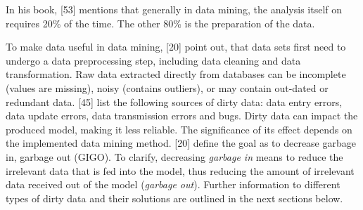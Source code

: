 In his book, \textcite{mccue2014data}[53] mentions that generally in data mining, the analysis itself on requires 20\% of the time. The other 80\% is the preparation of the data.

To make data useful in data mining, \textcite{DataMiningAndPredictiveAnalytics}[20] point out, that data sets first need to undergo a data preprocessing step, including data cleaning and data transformation. Raw data extracted directly from databases can be incomplete (values are missing), noisy (contains outliers), or may contain out-dated or redundant data. \textcite{dataPreprocessingInDataMining}[45] list the following sources of dirty data: data entry errors, data update errors, data transmission errors and bugs. Dirty data can impact the produced model, making it less reliable. The significance of its effect depends on the implemented data mining method. \textcite{DataMiningAndPredictiveAnalytics}[20] define the goal as to decrease garbage in, garbage out (GIGO). To clarify, decreasing \textit{garbage in} means to reduce the irrelevant data that is fed into the model, thus reducing the amount of irrelevant data received out of the model (\textit{garbage out}). Further information to different types of dirty data and their solutions are outlined in the next sections below.





